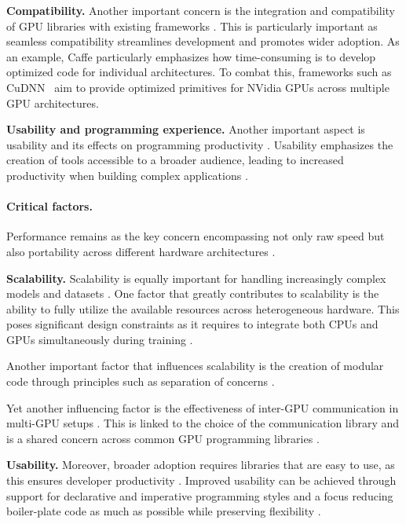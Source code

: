 \textbf{Compatibility.}
Another important concern is the integration and compatibility of GPU libraries with existing
frameworks . This is particularly important as seamless
compatibility streamlines development and promotes wider adoption. As an example, Caffe
\cite{Jia.EtAl_2014a} particularly emphasizes how time-consuming is to develop optimized code for
individual architectures. To combat this, frameworks such as CuDNN~\cite{chetlur_cudnn_2014} aim
to provide optimized primitives for NVidia GPUs across multiple GPU architectures.

\textbf{Usability and programming experience.}
Another important aspect is usability and its effects on programming productivity .
Usability emphasizes the creation of tools accessible to a broader audience, leading to increased
productivity when building complex applications .

\paragraph{Critical factors.}
Performance remains as the key concern encompassing not only raw speed but also portability across
different hardware architectures .

\textbf{Scalability.}
Scalability is equally important for handling increasingly complex models and datasets .
One factor that greatly contributes to scalability is the ability to fully utilize the available resources
across heterogeneous hardware. This poses significant design constraints as it requires to integrate
both CPUs and GPUs simultaneously during training .

Another important factor that influences scalability is the creation of modular code through
principles such as separation of concerns .

Yet another influencing factor is the effectiveness of inter-GPU communication in multi-GPU setups
. This is linked to the choice of the communication library and is a shared concern
across common GPU programming libraries
\cite{noauthor_uxlfoundationoneccl_2025,noauthor_nvidianccl_2025,noauthor_rocmrccl_2025}.

\textbf{Usability.}
Moreover, broader adoption requires libraries that are easy to use, as this ensures developer productivity
.
Improved usability can be achieved through support for declarative and imperative programming
styles and a focus reducing boiler-plate code as much as possible while preserving flexibility
.

